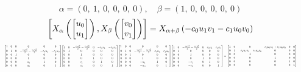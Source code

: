 \documentclass[11pt]{article}
\theoremstyle{definition}
\begin{document}
\[
\alpha = \left( 0, \  1, \  0, \  0, \  0, \  0\right), \quad \beta = \left( 1, \  0, \  0, \  0, \  0, \  0\right)
\]
\[
\scaletoalign{\textwidth}{\left[ X_{\alpha}\left(\left[\begin{matrix}u_{0}\\u_{1}\end{matrix}\right]\right), X_{\beta}\left(\left[\begin{matrix}v_{0}\\v_{1}\end{matrix}\right]\right) \right] = X_{\alpha + \beta}\left(- c_{0} u_{1} v_{1} - c_{1} u_{0} v_{0}\right)}
\]
\[
\scaletoalign{\textwidth}{{\left[\begin{matrix}1 & 0 & 0 & 0 & 0 & 0\\0 & 1 & 0 & - \frac{c_{0} u_{1}^{2}}{2} - \frac{c_{1} u_{0}^{2}}{2} & - c_{0} u_{1} & - c_{1} u_{0}\\0 & 0 & 1 & 0 & 0 & 0\\0 & 0 & 0 & 1 & 0 & 0\\0 & 0 & 0 & u_{1} & 1 & 0\\0 & 0 & 0 & u_{0} & 0 & 1\end{matrix}\right]} {\left[\begin{matrix}1 & 0 & - \frac{c_{0} v_{1}^{2}}{2} - \frac{c_{1} v_{0}^{2}}{2} & 0 & - c_{0} v_{1} & - c_{1} v_{0}\\0 & 1 & 0 & 0 & 0 & 0\\0 & 0 & 1 & 0 & 0 & 0\\0 & 0 & 0 & 1 & 0 & 0\\0 & 0 & v_{1} & 0 & 1 & 0\\0 & 0 & v_{0} & 0 & 0 & 1\end{matrix}\right]} {\left[\begin{matrix}1 & 0 & 0 & 0 & 0 & 0\\0 & 1 & 0 & - \frac{c_{0} u_{1}^{2}}{2} - \frac{c_{1} u_{0}^{2}}{2} & c_{0} u_{1} & c_{1} u_{0}\\0 & 0 & 1 & 0 & 0 & 0\\0 & 0 & 0 & 1 & 0 & 0\\0 & 0 & 0 & - u_{1} & 1 & 0\\0 & 0 & 0 & - u_{0} & 0 & 1\end{matrix}\right]} {\left[\begin{matrix}1 & 0 & - \frac{c_{0} v_{1}^{2}}{2} - \frac{c_{1} v_{0}^{2}}{2} & 0 & c_{0} v_{1} & c_{1} v_{0}\\0 & 1 & 0 & 0 & 0 & 0\\0 & 0 & 1 & 0 & 0 & 0\\0 & 0 & 0 & 1 & 0 & 0\\0 & 0 & - v_{1} & 0 & 1 & 0\\0 & 0 & - v_{0} & 0 & 0 & 1\end{matrix}\right]} = {\left[\begin{matrix}1 & 0 & 0 & c_{0} u_{1} v_{1} + c_{1} u_{0} v_{0} & 0 & 0\\0 & 1 & - c_{0} u_{1} v_{1} - c_{1} u_{0} v_{0} & 0 & 0 & 0\\0 & 0 & 1 & 0 & 0 & 0\\0 & 0 & 0 & 1 & 0 & 0\\0 & 0 & 0 & 0 & 1 & 0\\0 & 0 & 0 & 0 & 0 & 1\end{matrix}\right]}}
\]
\end{document}
